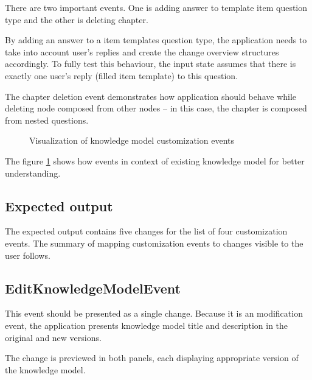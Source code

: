 There are two important events.
One is adding answer to template item question type and the other is deleting chapter.

By adding an answer to a item templates question type, the application needs to take into account user's replies and create the change overview structures accordingly.
To fully test this behaviour, the input state assumes that there is exactly one user's reply (filled item template) to this question.

The chapter deletion event demonstrates how application should behave while deleting node composed from other nodes -- in this case, the chapter is composed from nested questions.

\begin{figure}[H]
    \caption{Visualization of knowledge model customization events}\label{fig:cust-events}
\end{figure}

The figure \ref{fig:cust-events} shows how events in context of existing knowledge model for better understanding.

\subsection{Expected output}

The expected output contains five changes for the list of four customization events.
The summary of mapping customization events to changes visible to the user follows.

\subsection*{EditKnowledgeModelEvent}

This event should be presented as a single change.
Because it is an modification event, the application presents knowledge model title and description in the original and new versions.

The change is previewed in both panels, each displaying appropriate version of the knowledge model.

